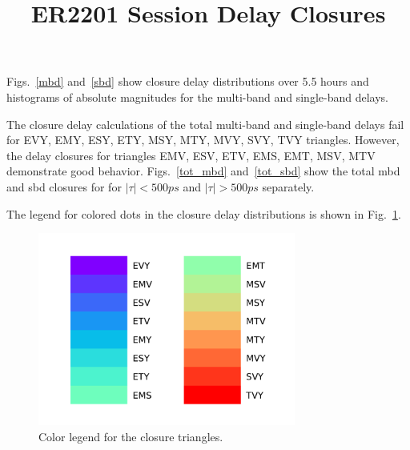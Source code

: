 \documentclass[letterpaper,twoside,12pt]{article}
\title{ER2201 Session Delay Closures}
\begin{document}
\maketitle

Figs.~\ref{mbd} and~\ref{sbd} show closure delay distributions over 5.5 hours and histograms of absolute magnitudes for the multi-band and single-band delays.

The closure delay calculations of the total multi-band and single-band delays fail for EVY, EMY, ESY, ETY, MSY, MTY, MVY, SVY, TVY triangles. However, the delay closures for triangles EMV, ESV, ETV, EMS, EMT, MSV, MTV demonstrate good behavior. Figs.~\ref{tot_mbd} and~\ref{tot_sbd} show the total mbd and sbd closures for for $|\tau| < 500 ps$ and $|\tau| > 500 ps$ separately. 

The legend for colored dots in the closure delay distributions is shown in Fig.~\ref{col_legend}.


\begin{figure}[h!]
  \centering
  \includegraphics[width=20pc]{Triangle_color_legend.pdf}
  \caption{\small Color legend for the closure triangles.}
  \label{col_legend}
\end{figure}
\end{document}
